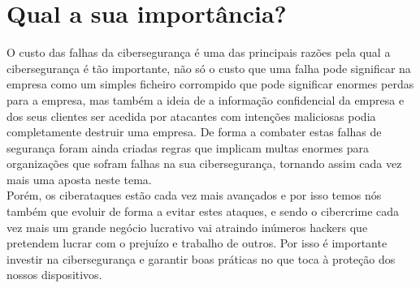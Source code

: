 \documentclass{report}
\begin{document}
\section{Qual a sua importância?}
\cite{techtarget}
O custo das falhas da cibersegurança é uma das principais razões pela qual a cibersegurança é tão importante, não só o custo que uma falha pode significar na empresa como um simples ficheiro corrompido que pode significar enormes perdas para a empresa, mas também a ideia de a informação confidencial da empresa e dos seus clientes ser acedida por atacantes com intenções maliciosas podia completamente destruir uma empresa. De forma a combater estas falhas de segurança foram ainda criadas regras que implicam multas enormes para organizações que sofram falhas na sua cibersegurança, tornando assim cada vez mais uma aposta neste tema.\\
Porém, os ciberataques estão cada vez mais avançados e por isso temos nós também que evoluir de forma a evitar estes ataques, e sendo o cibercrime cada vez mais um grande negócio lucrativo vai atraindo inúmeros hackers que pretendem lucrar com o prejuízo e trabalho de outros. Por isso é importante investir na cibersegurança e garantir boas práticas no que toca à proteção dos nossos dispositivos.\\
\clearpage
\cite{wiki}
\end{document}

